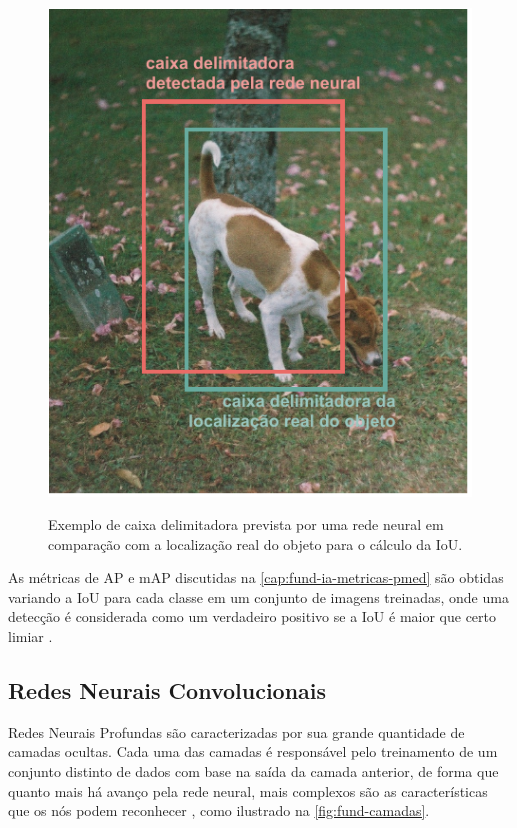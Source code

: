 \begin{figure}[h!] %
  \centering
  \caption{Exemplo de caixa delimitadora prevista por uma rede neural em comparação com a localização real do objeto para o cálculo da IoU.}
  \includegraphics[scale=1.1]{img/img-fundamentacao-iou.pdf}
  \label{fig:fund-iou}
\end{figure}

As métricas de AP e mAP discutidas na \autoref{cap:fund-ia-metricas-pmed} são obtidas variando a IoU para cada classe em um conjunto de imagens treinadas, onde uma detecção é considerada como um verdadeiro positivo se a IoU é maior que certo limiar \cite{ref:Sivarajkumar} .


\subsection{Redes Neurais Convolucionais} \label{cap:fund-ia-rn-conv}
Redes Neurais Profundas são caracterizadas por sua grande quantidade de camadas ocultas. Cada uma das camadas é responsável pelo treinamento de um conjunto distinto de dados com base na saída da camada anterior, de forma que quanto mais há avanço pela rede neural, mais complexos são as características que os nós podem reconhecer \cite{ref:Nicholson}, como ilustrado na \autoref{fig:fund-camadas}.

